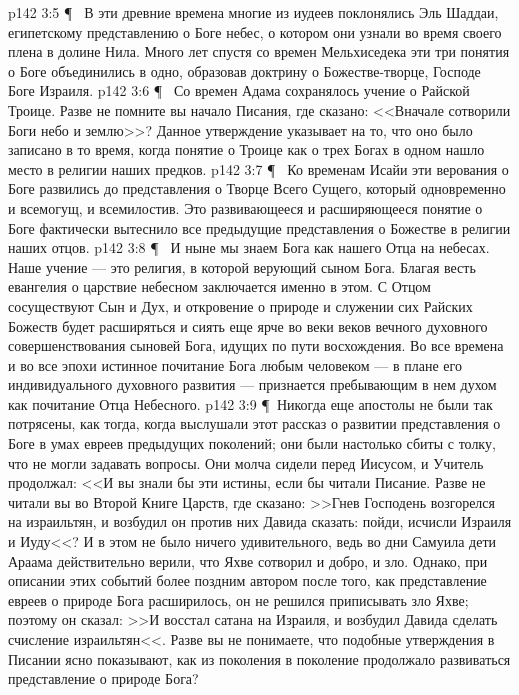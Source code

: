 \vs p142 3:5 \P\ \bibnobreakspace {} В эти древние времена многие из иудеев поклонялись Эль Шаддаи, египетскому представлению о Боге небес, о котором они узнали во время своего плена в долине Нила. Много лет спустя со времен Мельхиседека эти три понятия о Боге объединились в одно, образовав доктрину о Божестве\hyp{}творце, Господе Боге Израиля.
\vs p142 3:6 \P\ \bibnobreakspace {} Со времен Адама сохранялось учение о Райской Троице. Разве не помните вы начало Писания, где сказано: <<Вначале сотворили Боги небо и землю>>? Данное утверждение указывает на то, что оно было записано в то время, когда понятие о Троице как о трех Богах в одном нашло место в религии наших предков.
\vs p142 3:7 \P\ \bibnobreakspace {} Ко временам Исайи эти верования о Боге развились до представления о Творце Всего Сущего, который одновременно и всемогущ, и всемилостив. Это развивающееся и расширяющееся понятие о Боге фактически вытеснило все предыдущие представления о Божестве в религии наших отцов.
\vs p142 3:8 \P\ \bibnobreakspace {} И ныне мы знаем Бога как нашего Отца на небесах. Наше учение --- это религия, в которой верующий  сыном Бога. Благая весть евангелия о царствие небесном заключается именно в этом. С Отцом сосуществуют Сын и Дух, и откровение о природе и служении сих Райских Божеств будет расширяться и сиять еще ярче во веки веков вечного духовного совершенствования сыновей Бога, идущих по пути восхождения. Во все времена и во все эпохи истинное почитание Бога любым человеком --- в плане его индивидуального духовного развития --- признается пребывающим в нем духом как почитание Отца Небесного.
\vs p142 3:9 \P\ Никогда еще апостолы не были так потрясены, как тогда, когда выслушали этот рассказ о развитии представления о Боге в умах евреев предыдущих поколений; они были настолько сбиты с толку, что не могли задавать вопросы. Они молча сидели перед Иисусом, и Учитель продолжал: <<И вы знали бы эти истины, если бы читали Писание. Разве не читали вы во Второй Книге Царств, где сказано: >>Гнев Господень возгорелся на израильтян, и возбудил он против них Давида сказать: пойди, исчисли Израиля и Иуду<<? И в этом не было ничего удивительного, ведь во дни Самуила дети Араама действительно верили, что Яхве сотворил и добро, и зло. Однако, при описании этих событий более поздним автором после того, как представление евреев о природе Бога расширилось, он не решился приписывать зло Яхве; поэтому он сказал: >>И восстал сатана на Израиля, и возбудил Давида сделать счисление израильтян<<. Разве вы не понимаете, что подобные утверждения в Писании ясно показывают, как из поколения в поколение продолжало развиваться представление о природе Бога?

